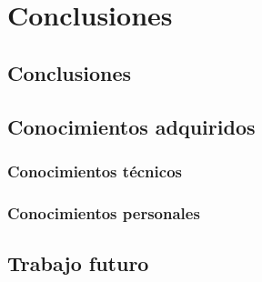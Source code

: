 \chapter{Conclusiones}

\section{Conclusiones}

\section{Conocimientos adquiridos}

\subsection{Conocimientos técnicos}

\subsection{Conocimientos personales}

\section{Trabajo futuro}